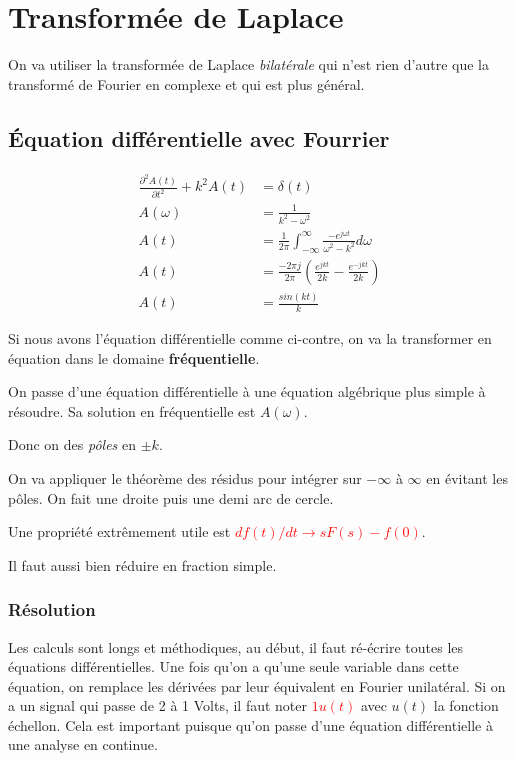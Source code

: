 \documentclass{report}
\begin{document}
\chapter{Transformée de Laplace} \label{Laplace}
On va utiliser la transformée de Laplace \textit{bilatérale} qui n'est rien d'autre que la transformé de Fourier en complexe et qui est plus général.

\section{Équation différentielle avec Fourrier}
\begin{figure}
\centering
\begin{align*}
\frac{\partial^2 A(t)}{\partial t^2} + k^2 A(t) &= \delta (t)\\
A(\omega ) &= \frac{1}{k^2 - \omega^2}\\
A(t) &= \frac{1}{2\pi} \int_{-\infty}^{\infty} \frac{-e^{j \omega t}}{\omega^2 - k^2} d\omega \\
A(t) &= \frac{-2 \pi j}{2\pi} \left( \frac{e^{jkt}}{2k} - \frac{e^{-jkt}}{2k} \right)\\
A(t) &= \frac{sin(kt)}{k}
\end{align*}
\end{figure}
Si nous avons l'équation différentielle comme ci-contre, on va la transformer en équation dans le domaine \textbf{fréquentielle}.\par 
On passe d'une équation différentielle à une équation algébrique plus simple à résoudre. Sa solution en fréquentielle est $A(\omega)$. \par 
Donc on des \textit{pôles} en $\pm k$.\par 
On va appliquer le théorème des résidus pour intégrer sur $- \infty$ à $\infty$ en évitant les pôles. On fait une droite puis une demi arc de cercle.\par 
Une propriété extrêmement utile est \textcolor{red}{$df(t)/dt \rightarrow sF(s) -f(0)$}.\par 
Il faut aussi bien réduire en fraction simple.

\subsection{Résolution}
Les calculs sont longs et méthodiques, au début, il faut ré-écrire toutes les équations différentielles. Une fois qu'on a qu'une seule variable dans cette équation, on remplace les dérivées par leur équivalent en Fourier unilatéral. Si on a un signal qui passe de 2 à 1 Volts, il faut noter \textcolor{red}{$1 u(t)$} avec $u(t)$ la fonction échellon. Cela est important puisque qu'on passe d'une équation différentielle à une analyse en continue.\\
\end{document}

